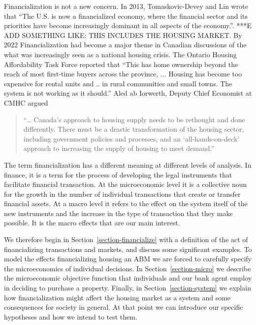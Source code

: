  Financialization is not a new concern. In 2013, Tomaskovic-Devey and Lin wrote that ``The U.S. is now a financialized economy, where the financial sector and its priorities have become increasingly dominant in all aspects of the economy.''\cite{tomaskovic-deveyFinancializationCausesInequality2013}. ***E ADD SOMETHING LIKE: THIS INCLUDES THE HOUSING MARKET. By 2022 Financialization had become a major theme in Canadian  discussions of the what was increasingly seen as a national housing crisis. The Ontario Housing Affordability Task Force reported that ``This has home ownership beyond the reach of most first-time buyers across the province, ... Housing has become too expensive for rental units and ..  in rural communities and small towns. The system is not working as it should.''   Aled ab Iorwerth, Deputy Chief Economist at CMHC argued
\begin{quotation}
     “… Canada’s approach to housing supply needs to be rethought and done differently. There must be a drastic transformation of the housing sector, including government policies and processes, and an ‘all-hands-on-deck’ approach to increasing the supply of housing to meet demand.”\cite{CanadaHousingSupply2022}
\end{quotation}

The term financialization has a different meaning at different levels of analysis.  In finance, it is a term for the process of developing the legal instruments that facilitate financial transaction.  At the microeconomic level it is a collective noun for the growth in the number of individual transactions that create or transfer financial assets. At a macro level it refers to the effect on the system itself of the new instruments and the increase in the type of transaction that they make possible. It is the macro effects that are our main interest.

We therefore begin in Section~\ref{section-financialize}  with a definition of the act of financializing transactions and markets,  and discuss some significant examples. To model the effects  financializing housing   an \gls{ABM} we are forced to carefully specify the microeconomics of  individual decisions. In Section~\ref{section-micro} we describe the microeconomic objective function that individuals and our bank agent employ in deciding to purchase a property. Finally, in  Section~\ref{section-system} we explain how financialization might affect the housing market as a system and some consequences for society in general. At that point we can introduce our specific hypotheses and how we intend to test them.

